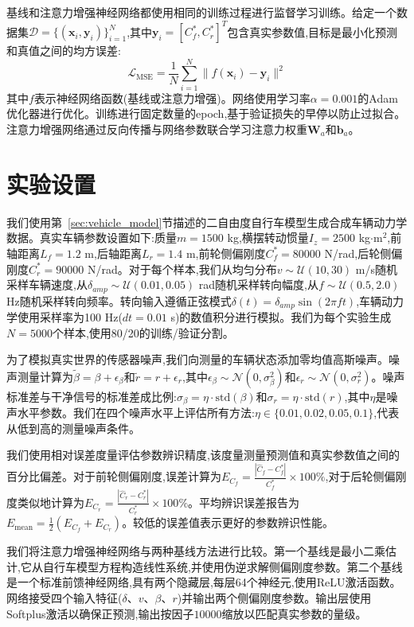 \documentclass[Afour,sageh,times]{sagej}
\begin{document}
基线和注意力增强神经网络都使用相同的训练过程进行监督学习训练。给定一个数据集$\mathcal{D} = \{(\mathbf{x}_i, \mathbf{y}_i)\}_{i=1}^N$,其中$\mathbf{y}_i = [C_f^*, C_r^*]^T$包含真实参数值,目标是最小化预测和真值之间的均方误差:
\begin{equation}
\mathcal{L}_{\text{MSE}} = \frac{1}{N} \sum_{i=1}^N \|f(\mathbf{x}_i) - \mathbf{y}_i\|^2
\end{equation}
其中$f$表示神经网络函数(基线或注意力增强)。网络使用学习率$\alpha = 0.001$的Adam优化器进行优化。训练进行固定数量的epoch,基于验证损失的早停以防止过拟合。注意力增强网络通过反向传播与网络参数联合学习注意力权重$\mathbf{W}_a$和$\mathbf{b}_a$。

\section{实验设置}
\label{sec:experimental}

我们使用第~\ref{sec:vehicle_model}节描述的二自由度自行车模型生成合成车辆动力学数据。真实车辆参数设置如下:质量$m = 1500$ kg,横摆转动惯量$I_z = 2500$ kg$\cdot$m$^2$,前轴距离$L_f = 1.2$ m,后轴距离$L_r = 1.4$ m,前轮侧偏刚度$C_f^* = 80000$ N/rad,后轮侧偏刚度$C_r^* = 90000$ N/rad。对于每个样本,我们从均匀分布$v \sim \mathcal{U}(10, 30)$ m/s随机采样车辆速度,从$\delta_{amp} \sim \mathcal{U}(0.01, 0.05)$ rad随机采样转向幅度,从$f \sim \mathcal{U}(0.5, 2.0)$ Hz随机采样转向频率。转向输入遵循正弦模式$\delta(t) = \delta_{amp} \sin(2\pi f t)$,车辆动力学使用采样率为100 Hz($dt = 0.01$ s)的数值积分进行模拟。我们为每个实验生成$N = 5000$个样本,使用80/20的训练/验证分割。

为了模拟真实世界的传感器噪声,我们向测量的车辆状态添加零均值高斯噪声。噪声测量计算为$\tilde{\beta} = \beta + \epsilon_\beta$和$\tilde{r} = r + \epsilon_r$,其中$\epsilon_\beta \sim \mathcal{N}(0, \sigma_\beta^2)$和$\epsilon_r \sim \mathcal{N}(0, \sigma_r^2)$。噪声标准差与干净信号的标准差成比例:$\sigma_\beta = \eta \cdot \text{std}(\beta)$和$\sigma_r = \eta \cdot \text{std}(r)$,其中$\eta$是噪声水平参数。我们在四个噪声水平上评估所有方法:$\eta \in \{0.01, 0.02, 0.05, 0.1\}$,代表从低到高的测量噪声条件。

我们使用相对误差度量评估参数辨识精度,该度量测量预测值和真实参数值之间的百分比偏差。对于前轮侧偏刚度,误差计算为$E_{C_f} = \frac{|\hat{C}_f - C_f^*|}{C_f^*} \times 100\%$,对于后轮侧偏刚度类似地计算为$E_{C_r} = \frac{|\hat{C}_r - C_r^*|}{C_r^*} \times 100\%$。平均辨识误差报告为$E_{\text{mean}} = \frac{1}{2}(E_{C_f} + E_{C_r})$。较低的误差值表示更好的参数辨识性能。

我们将注意力增强神经网络与两种基线方法进行比较。第一个基线是最小二乘估计,它从自行车模型方程构造线性系统,并使用伪逆求解侧偏刚度参数。第二个基线是一个标准前馈神经网络,具有两个隐藏层,每层64个神经元,使用ReLU激活函数。网络接受四个输入特征($\delta$、$v$、$\beta$、$r$)并输出两个侧偏刚度参数。输出层使用Softplus激活以确保正预测,输出按因子$10000$缩放以匹配真实参数的量级。
\end{document}
